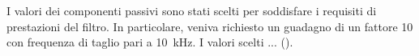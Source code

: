 I valori dei componenti passivi sono stati scelti per soddisfare i requisiti di prestazioni del filtro. In particolare, veniva richiesto un guadagno di un fattore 10 con frequenza di taglio pari a \SI{10}{\kilo\hertz}. I valori scelti ... ().

